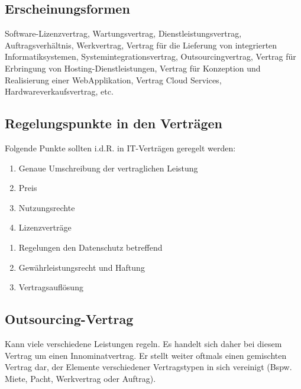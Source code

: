 \subsection{Erscheinungsformen}
Software-Lizenzvertrag, Wartungsvertrag, Dienstleistungsvertrag, Auftragsverhältnis, Werkvertrag, Vertrag für die Lieferung von integrierten Informatiksystemen, Systemintegrationsvertrag, Outsourcingvertrag, Vertrag für Erbringung von Hosting-Dienstleistungen, Vertrag für Konzeption und Realisierung einer WebApplikation, Vertrag Cloud Services, Hardwareverkaufsvertrag, etc.

\subsection{Regelungspunkte in den Verträgen}
Folgende Punkte sollten i.d.R. in IT-Verträgen geregelt werden:\\

\begin{minipage}{0.5\linewidth}
    \begin{enumerate}
        \item Genaue Umschreibung der vertraglichen Leistung
        \item Preis
        \item Nutzungsrechte
        \item Lizenzverträge
    \end{enumerate}
\end{minipage}
\begin{minipage}{0.5\linewidth}
    \begin{enumerate}
        \item Regelungen den Datenschutz betreffend
        \item Gewährleistungsrecht und Haftung
        \item Vertragsauflösung
    \end{enumerate}
\end{minipage}

\newpage

\subsection{Outsourcing-Vertrag}
Kann viele verschiedene Leistungen regeln. Es handelt sich daher bei diesem Vertrag um einen Innominatvertrag. Er stellt weiter oftmals einen gemischten Vertrag dar, der Elemente verschiedener Vertragstypen in sich vereinigt (Bspw. Miete, Pacht, Werkvertrag oder Auftrag).\\


